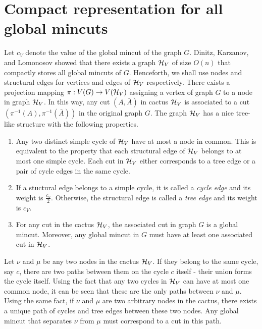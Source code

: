 \section{Compact representation for all global mincuts} \label{appendix:cactus}

Let $c_V$ denote the value of the global mincut of the graph $G$.
Dinitz, Karzanov, and Lomonosov \cite{DL76} showed that there exists a graph ${\cal H}_V$ of size $O(n)$ that compactly stores all global mincuts of $G$. 
Henceforth, we shall use nodes and structural edges for vertices and edges of ${\cal H}_V$ respectively. There exists a projection mapping $\pi:V(G)\rightarrow V({\cal H}_V)$ assigning a vertex of graph $G$ to a node in graph ${\cal H}_V$. In this way, any cut $(A,{\bar A})$ in cactus ${\cal H}_V$ is associated to a cut $(\pi^{-1}(A),\pi^{-1}(\bar A))$ in the original graph $G$.
The graph ${\cal H}_V$ has a nice tree-like structure with the following properties.
\begin{enumerate}
    \item Any two distinct simple cycle of ${\cal H}_V$ have at most a node in common. This is equivalent to the property that each structural edge of ${\cal H}_V$ belongs to at most one simple cycle. Each cut in ${\cal H}_V$ either corresponds to a tree edge or a pair of cycle edges in the same cycle.
    \item If a stuctural edge belongs to a simple cycle, it is called a \textit{cycle edge} and its weight is $\frac{c_V}{2}$. Otherwise, the structural edge is called a \textit{tree edge} and its weight is $c_V$.
    \item For any cut in the cactus ${\cal H}_V$, the associated cut in graph $G$ is a global mincut. Moreover, any global mincut in $G$ must have at least one associated cut in ${\cal H}_V$.
\end{enumerate}

Let $\nu$ and $\mu$ be any two nodes in the cactus ${\cal H}_V$. If they belong to the same cycle, say $c$, there are two paths between them on the cycle $c$ itself - their union forms the cycle itself. Using the fact that any two cycles in  ${\cal H}_V$ can have at most one common node, it can be seen that these are the only paths between $\nu$ and $\mu$. Using the same fact, if $\nu$ and $\mu$ are two arbitrary nodes in the cactus, there exists a unique path of cycles and tree edges between these two nodes. Any global mincut that separates $\nu$ from $\mu$ must correspond to a cut in this path.

